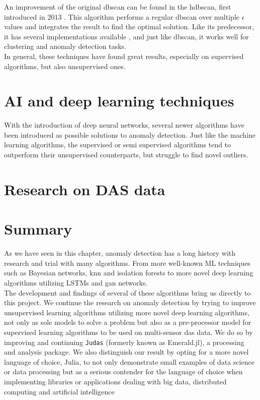 An improvement of the original \acrshort{dbscan} can be found in the \acrfull{hdbscan}, first introduced in 2013 \cite{10.1007/978-3-642-37456-2_14}. This algorithm performs a regular dbscan over multiple $\epsilon$ values and integrates the result to find the optimal solution. Like its predecessor, it has several implementations available \cite{McInnes2017}, and just like dbscan, it works well for clustering and anomaly detection tasks. \\


In general, these techniques have found great results, especially on supervised algorithms, but also unsupervised ones. 

\section{AI and deep learning techniques}

With the introduction of deep neural networks, several newer algorithms have been introduced as possible solutions to anomaly detection. Just like the machine learning algorithms, the supervised or semi supervised algorithms tend to outperform their unsupervised counterparts, but struggle to find novel outliers. 

\section{Research on DAS data}


\section{Summary}

As we have seen in this chapter, anomaly detection has a long history with research and trial with many algorithms. From more well-known ML techniques such as Bayesian networks, knn and isolation forests to more novel deep learning algorithms utilizing LSTMs and \acrshort{gan} networks. \\

The development and findings of several of these algorithms bring us directly to this project. We continue the research on anomaly detection by trying to improve unsupervised learning algorithms utilizing more novel deep learning algorithms, not only as sole models to solve a problem but also as a pre-processor model for supervised learning algorithms to be used on multi-sensor das data. We do so by improving and continuing \texttt{Judas} (formerly known as Emerald.jl), a processing and analysis package. We also distinguish our result by opting for a more novel language of choice, Julia, to not only demonstrate small examples of data science or data processing but as a serious contender for the language of choice when implementing libraries or applications dealing with big data, distributed computing and artificial intelligence







